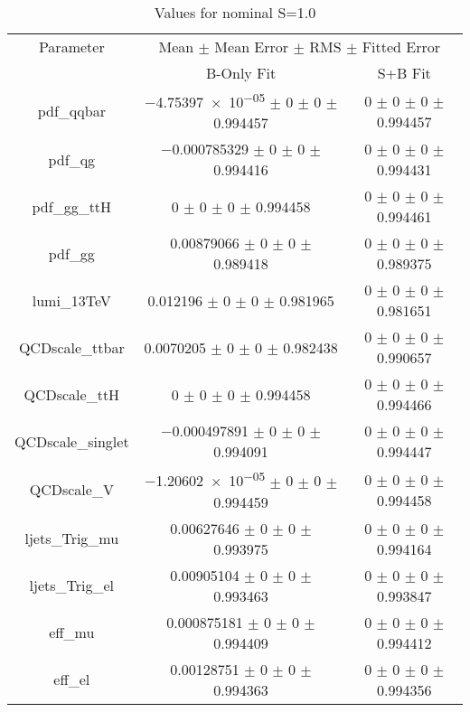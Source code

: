 \begin{table}
\centering
\caption{Values for nominal S=1.0}
\begin{tabular}{ccc}
\toprule
Parameter 	& \multicolumn{2}{c}{Mean $\pm$ Mean Error $\pm$ RMS $\pm$ Fitted Error}\\
 	& B-Only Fit & S+B Fit\\
\midrule
pdf\_qqbar 	& \num{-4.75397e-05} $\pm$ \num{0} $\pm$ \num{0} $\pm$ \num{0.994457} 	& \num{0} $\pm$ \num{0} $\pm$ \num{0} $\pm$ \num{0.994457}\\
pdf\_qg 	& \num{-0.000785329} $\pm$ \num{0} $\pm$ \num{0} $\pm$ \num{0.994416} 	& \num{0} $\pm$ \num{0} $\pm$ \num{0} $\pm$ \num{0.994431}\\
pdf\_gg\_ttH 	& \num{0} $\pm$ \num{0} $\pm$ \num{0} $\pm$ \num{0.994458} 	& \num{0} $\pm$ \num{0} $\pm$ \num{0} $\pm$ \num{0.994461}\\
pdf\_gg 	& \num{0.00879066} $\pm$ \num{0} $\pm$ \num{0} $\pm$ \num{0.989418} 	& \num{0} $\pm$ \num{0} $\pm$ \num{0} $\pm$ \num{0.989375}\\
lumi\_13TeV 	& \num{0.012196} $\pm$ \num{0} $\pm$ \num{0} $\pm$ \num{0.981965} 	& \num{0} $\pm$ \num{0} $\pm$ \num{0} $\pm$ \num{0.981651}\\
QCDscale\_ttbar 	& \num{0.0070205} $\pm$ \num{0} $\pm$ \num{0} $\pm$ \num{0.982438} 	& \num{0} $\pm$ \num{0} $\pm$ \num{0} $\pm$ \num{0.990657}\\
QCDscale\_ttH 	& \num{0} $\pm$ \num{0} $\pm$ \num{0} $\pm$ \num{0.994458} 	& \num{0} $\pm$ \num{0} $\pm$ \num{0} $\pm$ \num{0.994466}\\
QCDscale\_singlet 	& \num{-0.000497891} $\pm$ \num{0} $\pm$ \num{0} $\pm$ \num{0.994091} 	& \num{0} $\pm$ \num{0} $\pm$ \num{0} $\pm$ \num{0.994447}\\
QCDscale\_V 	& \num{-1.20602e-05} $\pm$ \num{0} $\pm$ \num{0} $\pm$ \num{0.994459} 	& \num{0} $\pm$ \num{0} $\pm$ \num{0} $\pm$ \num{0.994458}\\
ljets\_Trig\_mu 	& \num{0.00627646} $\pm$ \num{0} $\pm$ \num{0} $\pm$ \num{0.993975} 	& \num{0} $\pm$ \num{0} $\pm$ \num{0} $\pm$ \num{0.994164}\\
ljets\_Trig\_el 	& \num{0.00905104} $\pm$ \num{0} $\pm$ \num{0} $\pm$ \num{0.993463} 	& \num{0} $\pm$ \num{0} $\pm$ \num{0} $\pm$ \num{0.993847}\\
eff\_mu 	& \num{0.000875181} $\pm$ \num{0} $\pm$ \num{0} $\pm$ \num{0.994409} 	& \num{0} $\pm$ \num{0} $\pm$ \num{0} $\pm$ \num{0.994412}\\
eff\_el 	& \num{0.00128751} $\pm$ \num{0} $\pm$ \num{0} $\pm$ \num{0.994363} 	& \num{0} $\pm$ \num{0} $\pm$ \num{0} $\pm$ \num{0.994356}\\

\end{tabular}
\end{table}
